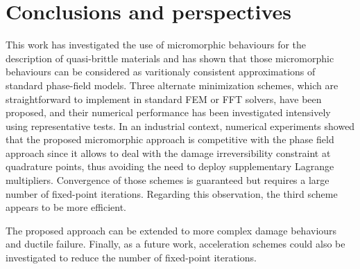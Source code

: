 \section{Conclusions and perspectives}

This work has investigated the use of micromorphic behaviours for the
description of quasi-brittle materials and has shown that those
micromorphic behaviours can be considered as varitionaly consistent
approximations of standard phase-field models.
%
%
%
Three alternate minimization schemes, which are straightforward to
implement in standard FEM or FFT solvers, have been proposed, and their numerical performance has been investigated intensively using representative tests. 
In an industrial context, numerical experiments showed that the proposed micromorphic approach is competitive with the phase field approach
since it allows to deal with
the damage irreversibility constraint at quadrature points, thus avoiding the need to deploy supplementary Lagrange multipliers.
%
%
%
Convergence of those schemes is guaranteed but requires a large number
of fixed-point iterations. Regarding this observation, the third
scheme appears to be more efficient.

The proposed approach can be extended to more complex damage behaviours
and ductile failure.
%
%
%
Finally, as a future work, acceleration schemes could also be
investigated to reduce the number of fixed-point iterations.
